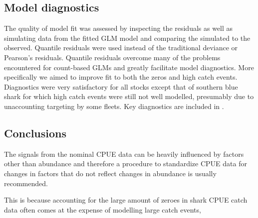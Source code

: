 
\subsection{Model diagnostics}
The quality of model fit was assessed by inspecting the residuals as well as simulating data from the fitted GLM model and comparing the simulated to the observed. 
Quantile residuals \citep{Dunn1996_a} were used instead of the traditional deviance or Pearson's residuals. Quantile residuals overcome many of the problems encountered for count-based GLMs and greatly facilitate model diagnostics. More specifically we aimed to improve fit to both the zeros and high catch events. Diagnostics were very satisfactory for all stocks except that of southern blue shark for which high catch events were still not well modelled, presumably due to unaccounting targeting by some fleets. Key diagnostics are included in .


\subsection{Conclusions}
The signals from the nominal  CPUE data can be heavily influenced by factors other than abundance and therefore a procedure to standardize CPUE data for changes in factors  that do not reflect changes in abundance is usually recommended. 

This is because accounting for the large amount of zeroes in shark CPUE catch data often comes at the expense of modelling large catch events, 
 
